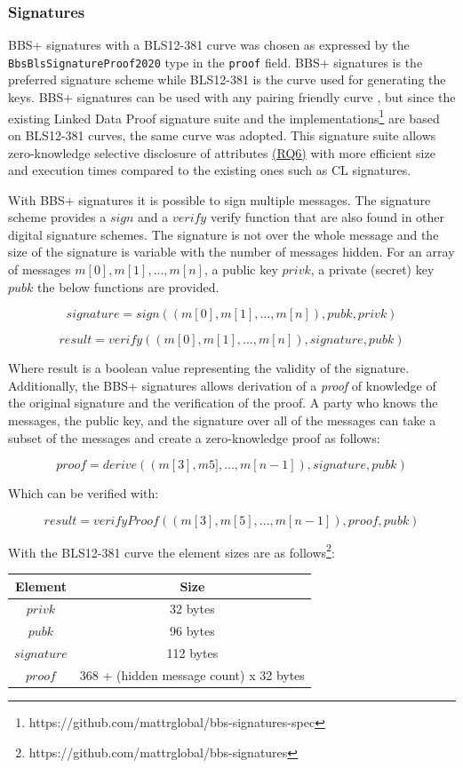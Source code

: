\subsubsection{Signatures}

BBS+ signatures with a BLS12-381 curve was chosen as expressed by the \lstinline{BbsBlsSignatureProof2020} type in the \lstinline{proof} field. BBS+ signatures is the preferred signature scheme while BLS12-381 is the curve used for generating the keys. BBS+ signatures can be used with any pairing friendly curve \parencite{irtf-cfrg-pairing-friendly-curves-09}, but since the existing Linked Data Proof signature suite \parencite{looker_steele_2021} and the implementations\footnote{https://github.com/mattrglobal/bbs-signatures-spec} are based on BLS12-381 curves, the same curve was adopted. This signature suite allows zero-knowledge selective disclosure of attributes \hyperref[rq:selective-disclosure]{(RQ6)} with more efficient size and execution times \parencite{anoncreds} compared to the existing ones such as \acrshort{CL} signatures. 

With BBS+ signatures it is possible to sign multiple messages. The signature scheme provides a $sign$ and a $verify$ verify function that are also found in other digital signature schemes. The signature is not over the whole message and the size of the signature is variable with the number of messages hidden. For an array of messages $m[0], m[1], ..., m[n]$, a public key $privk$, a private (secret) key $pubk$ the below functions are provided.

\[signature = sign((m[0], m[1], ..., m[n]), pubk, privk)\]

\[result = verify((m[0], m[1], ..., m[n]), signature, pubk)\]

Where result is a boolean value representing the validity of the signature. Additionally, the BBS+ signatures allows derivation of a \textit{proof} of knowledge of the original signature and the verification of the proof. A party who knows the messages, the public key, and the signature over all of the messages can take a subset of the messages and create a zero-knowledge proof as follows:

\[proof = derive( (m[3], m5],..., m[n-1]), signature, pubk)\]

Which can be verified with: 

\[result = verifyProof( (m[3], m[5],..., m[n-1]), proof, pubk) \]

With the BLS12-381 curve the element sizes are as follows\footnote{https://github.com/mattrglobal/bbs-signatures}:
\begin{center}
\begin{tabular}{ c c }
  Element & Size    \\
  \hline
  $privk$   &   32 bytes    \\
  $pubk$    &   96 bytes    \\
  $signature$ & 112 bytes   \\
  $proof$   &   368 + (hidden message count) x 32 bytes
\end{tabular}
\end{center}


